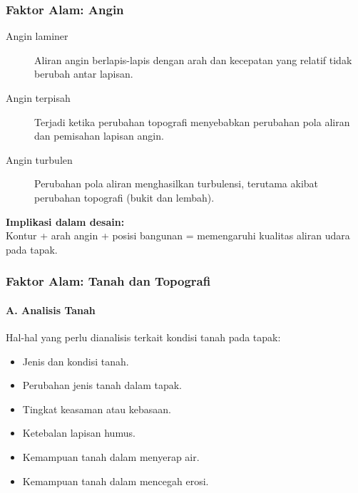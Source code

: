 \documentclass[../main.tex]{subfiles}
\begin{document}
\begin{frame}[mytitle=standard, c, mycolor=digiPH_ocean, dark]
	\frametitle{Faktor Alam: Angin}

	\begin{description}
		\item[Angin laminer] Aliran angin berlapis-lapis dengan arah dan kecepatan yang relatif tidak berubah antar lapisan.
		\item[Angin terpisah] Terjadi ketika perubahan topografi menyebabkan perubahan pola aliran dan pemisahan lapisan angin.
		\item[Angin turbulen] Perubahan pola aliran menghasilkan turbulensi, terutama akibat perubahan topografi (bukit dan lembah).
	\end{description}

	\vspace{0.5cm}
	\textbf{Implikasi dalam desain:} \\
	Kontur + arah angin + posisi bangunan = memengaruhi kualitas aliran udara pada tapak.
\end{frame}

\begin{frame}[mytitle=standard, t, mycolor=digiPH_white, light]
	\frametitle{Faktor Alam: Tanah dan Topografi}
	\framesubtitle{A. Analisis Tanah}

	Hal-hal yang perlu dianalisis terkait kondisi tanah pada tapak:
	\begin{itemize}
		\item Jenis dan kondisi tanah.
		\item Perubahan jenis tanah dalam tapak.
		\item Tingkat keasaman atau kebasaan.
		\item Ketebalan lapisan humus.
		\item Kemampuan tanah dalam menyerap air.
		\item Kemampuan tanah dalam mencegah erosi.
	\end{itemize}
\end{frame}
\end{document}
